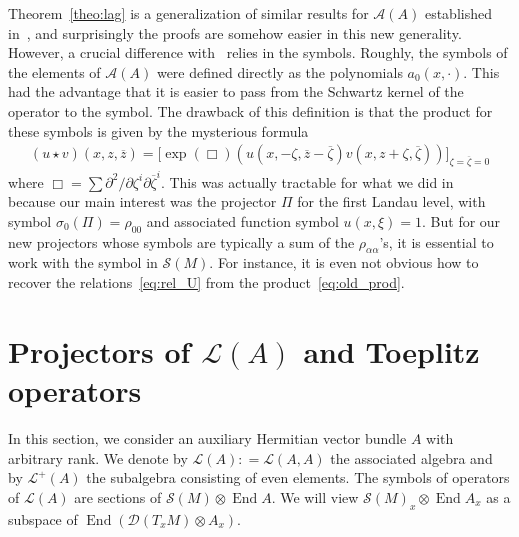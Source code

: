 \documentclass[10pt,a4paper]{article}
\theoremstyle{definition}
\numberwithin{equation}{section}
\newcommand{\al}{{\alpha}}
\newcommand{\si}{{\sigma}}
\newcommand{\con}{\overline}
\newcommand{\op}{\operatorname}
\newcommand{\D}{\mathcal{D}}
\newcommand{\symb}{\mathcal{S}}
\newcommand{\lag}{\mathcal{L}}
\newcommand{\clA}{\mathcal{A}}
\newcommand{\Uu}{\rho}
\begin{document}
Theorem~\ref{theo:lag} is a generalization of similar results for $\clA(A)$ established in~\cite{oim}, and surprisingly the proofs are somehow easier in this new generality. However, a crucial difference with~\cite{oim} relies in the symbols. Roughly, the symbols of the elements of $\clA(A)$ were defined directly as the polynomials $a_0 (x,\cdot)$. This had the advantage that it is easier to pass from the Schwartz kernel of the operator to the symbol. The drawback of this definition is that the product for these symbols is given by the mysterious formula
\begin{gather}\label{eq:old_prod}
(u \star v) (x, z, \con{z}) =\bigl[\exp (\Box) \left(u \left(x, - \zeta, \con{z} - \con {\zeta}\right) v \left(x, z+ \zeta, \con{\zeta}\right)\right)\bigr]_{\zeta = \con{\zeta} =0 }
\end{gather}
where $\Box = \sum \partial^2 / \partial \zeta^i \partial \con{\zeta}^i$. This was actually tractable for what we did in~\cite{oim} because our main interest was the projector $\Pi$ for the first Landau level, with symbol $\si_0(\Pi)=
\Uu_{00}$ and associated function symbol $u(x,\xi) =1$. But for our new projectors whose symbols are typically a sum of the $\Uu_{\al\al}$'s, it is essential to work with the symbol in $\symb (M)$. For instance, it is even not obvious how to recover the relations~\eqref{eq:rel_U} from the product~\eqref{eq:old_prod}.



\section{Projectors of \texorpdfstring{$\lag (A)$}{L(A)} and Toeplitz operators} \label{sec:projectors-Toeplitz}

In this section, we consider an auxiliary Hermitian vector bundle $A$ with arbitrary rank. We denote by $\lag (A): = \lag (A,A)$ the associated algebra and by $\lag^+(A)$ the subalgebra consisting of even elements. The symbols of operators of $\lag (A)$ are sections of $\symb (M) \otimes \op{End} A$. We will view $\symb (M)_x \otimes \op{End} A_x$ as a subspace of $\op{End} (\D (T_xM)
\otimes A_x)$.
\end{document}

